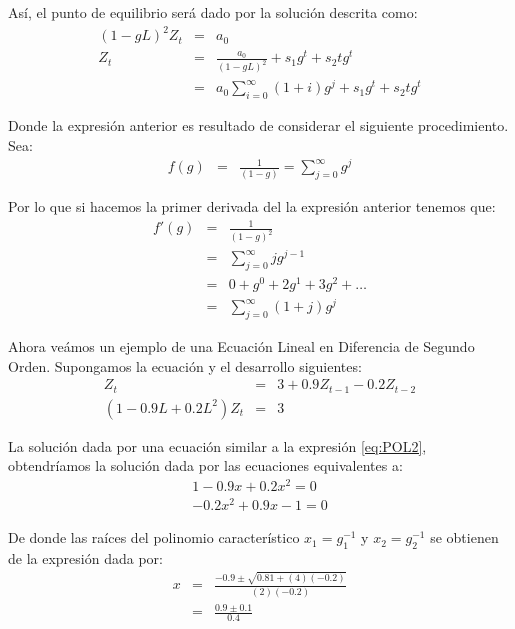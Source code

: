\documentclass[
]{book}
\begin{document}
Así, el punto de equilibrio será dado por la solución descrita como:
\begin{eqnarray}
    (1 - g L)^2 Z_t & = & a_0 \nonumber \\
    Z_t & = & \frac{a_0}{(1 - g L)^2} + s_1 g^t + s_2 t g^t \nonumber \\
    & = & a_0 \sum_{i = 0}^{\infty} (1 + i) g^j + s_1 g^t + s_2 t g^t
    \label{eq:Conver7}
\end{eqnarray}

Donde la expresión anterior es resultado de considerar el siguiente procedimiento. Sea:
\begin{eqnarray}
    f(g) & = & \frac{1}{(1 - g)} = \sum_{j = 0}^{\infty} g^j \nonumber
\end{eqnarray}

Por lo que si hacemos la primer derivada del la expresión anterior tenemos que:
\begin{eqnarray}
    f'(g) & = & \frac{1}{(1 - g)^2} \nonumber \\
    & = & \sum_{j = 0}^{\infty} j g^{j-1} \nonumber \\
    & = & 0 + g^0 + 2 g^1 + 3 g^2 + \ldots \nonumber \\
    & = & \sum_{j = 0}^{\infty} (1 + j) g^j \nonumber
\end{eqnarray}

Ahora veámos un ejemplo de una Ecuación Lineal en Diferencia de Segundo Orden. Supongamos la ecuación y el desarrollo siguientes:
\begin{eqnarray}
    Z_t & = & 3 + 0.9 Z_{t-1} - 0.2 Z_{t-2} \nonumber \\
    (1 - 0.9 L + 0.2 L^2) Z_t & = & 3 \nonumber
\end{eqnarray}

La solución dada por una ecuación similar a la expresión \eqref{eq:POL2}, obtendríamos la solución dada por las ecuaciones equivalentes a:
\begin{eqnarray}
    1 - 0.9 x + 0.2 x^2 = 0 \nonumber \\
    - 0.2 x^2 + 0.9 x - 1 = 0 \nonumber
\end{eqnarray}

De donde las raíces del polinomio característico \(x_1 = g_1^{-1}\) y \(x_2 = g_2^{-1}\) se obtienen de la expresión dada por:
\begin{eqnarray}
    x & = &\frac{-0.9 \pm \sqrt{0.81 + (4)(-0.2)}}{(2)(-0.2)} \nonumber \\
    & = & \frac{0.9 \pm 0.1}{0.4} \nonumber
\end{eqnarray}
\end{document}
